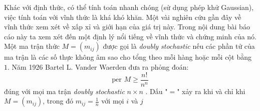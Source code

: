 \documentclass[a4paper, 12pt]{report}
\begin{document}
Khác với định thức, có thể tính toán nhanh chóng (sử dụng phép khử Gaussian), việc tính toán với vĩnh thức là khá khó khăn. Một vài nghiên cứu gần đây về vĩnh thức xem xét về xấp xỉ và giới hạn của giá trị này. Trong nội dung bài báo cáo này ta xem xét đến một định lý nổi tiếng về vĩnh thức và chứng minh của nó. Một ma trận thức $M=(m_{ij})$ được gọi là \textit{doubly stochastic} nếu các phần tử của ma trận là các số thực không âm sao cho tổng theo mỗi hàng hoặc mỗi cột bằng $1$. Năm 1926 Bartel L. Vander Waerden đưa ra phỏng đoán: 
\begin{equation}
\textrm{per } M \geq \frac{n!}{n^n}
\end{equation}
đúng với mọi ma trận \textit{doubly stochastic} $n \times n $ . Dấu "$=$" xảy ra khi và chỉ khi $M=(m_{ij})$, trong đó $m_{ij} = \frac{1}{n}$ với mọi $i$ và $j$
\end{document}
